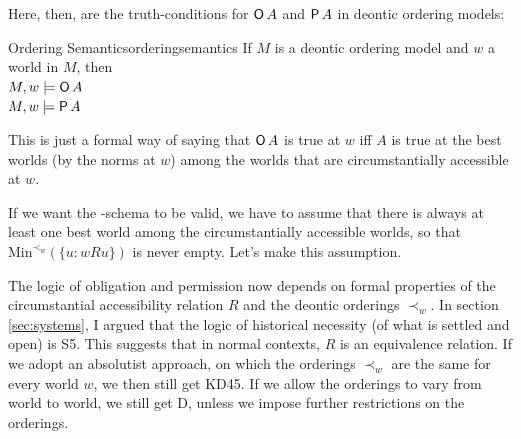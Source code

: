 Here, then, are the truth-conditions for $\operatorname{\mathsf{O}} A$ and $\operatorname{\mathsf{P}} A$ in deontic ordering
models:


\begin{definition}{Ordering Semantics}{orderingsemantics}
  If $M$ is a deontic ordering model and $w$ a world in $M$, then\\[1mm]
  $M,w \models \Ob A$ \\
  $M,w \models \Pe A$ 
\end{definition}
\noindent%
This is just a formal way of saying that $\operatorname{\mathsf{O}} A$ is true at $w$ iff $A$ is true
at the best worlds (by the norms at $w$) among the worlds that are circumstantially accessible at $w$.

If we want the -schema to be valid, we have to assume that there is always
at least one best world among the circumstantially accessible worlds, so that
$\mathrm{Min}^{\prec_w}(\{ u: wRu\})$ is never empty. Let's make this assumption.

The logic of obligation and permission now depends on formal properties of the
circumstantial accessibility relation $R$ and the deontic orderings $\prec_w$.
In section \ref{sec:systems}, I argued that the logic of historical necessity
(of what is settled and open) is S5. This suggests that in normal contexts, $R$
is an equivalence relation. If we adopt an absolutist approach, on which the
orderings $\prec_{w}$ are the same for every world $w$, we then still get KD45.
If we allow the orderings to vary from world to world, we still get D, unless we
impose further restrictions on the orderings.


